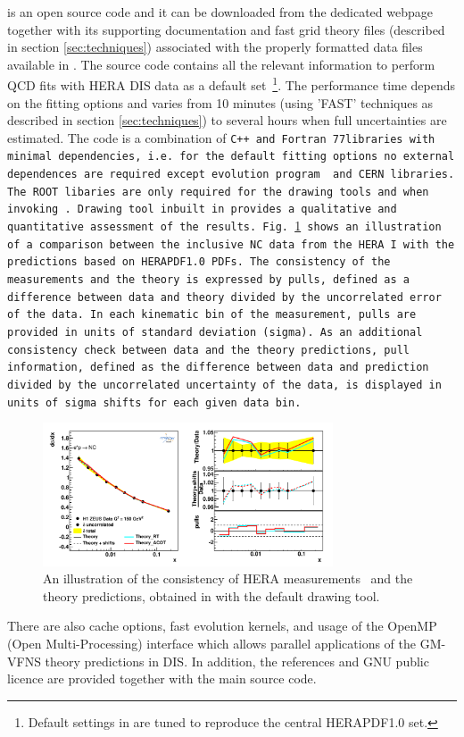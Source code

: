 
\fitter is an open source code and it can be downloaded from the dedicated webpage \cite{herafitter:page}
together with its supporting documentation and 
fast grid theory files (described in section \ref{sec:techniques}) associated with the properly formatted data files available in \fitter.
The source code contains all the relevant information to perform QCD fits with HERA DIS data as a default 
set~\footnote{Default settings in \fitter are tuned to reproduce the central HERAPDF1.0 set.}. 
The performance time depends on the fitting options and varies from 10 minutes 
(using 'FAST' techniques as described in section \ref{sec:techniques}) to several hours when full uncertainties are estimated. The \fitter code is a combination of \tt C++ \rm and \tt Fortran 77\rm libraries with minimal 
dependencies, i.e. for the default fitting options no external dependences are required except \qcdnum evolution program \cite{qcdnum} and CERN libraries. 
The \tt ROOT \rm  libaries are only required for the drawing tools and when invoking \applgrid\rm.  
Drawing tool inbuilt in \fitter provides a qualitative and quantitative assessment of the results.
Fig.~\ref{fig:data} shows an illustration of a comparison between the inclusive NC data from the HERA I
with the predictions based on 
HERAPDF1.0 PDFs.
The consistency of the measurements and the theory is expressed by pulls, defined as a difference between data and theory divided by the uncorrelated error of the data. 
In each kinematic bin of the measurement, pulls are provided in units of standard deviation (sigma).  
As an additional consistency check between data and the theory predictions, pull information, defined as the difference between data and prediction divided by the uncorrelated uncertainty of the data, is displayed in units of sigma shifts for each given data bin.
\begin{figure}[!ht]
   \centering
   \includegraphics[width=8.6cm]{datatheory.pdf}
   \caption{An illustration of the consistency of HERA measurements~\cite{h1zeus:2009wt} and the theory predictions, 
       obtained in \fitter with the default drawing tool.} 
 \label{fig:data}
\end{figure}

%
There are also cache options, fast evolution kernels, and usage of the OpenMP (Open Multi-Processing)  interface which allows parallel applications of the GM-VFNS theory predictions in DIS. 
In addition, the \fitter references and GNU public licence are provided 
together with the main source code. 


